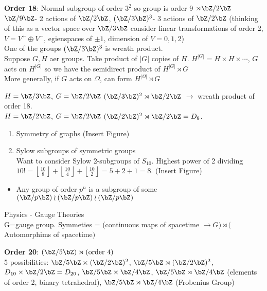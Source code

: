 \noindent
\textbf{Order 18}: Normal subgroup of order $3^2$ so group is order 9 $\rtimes \bZ/2\bZ$ \\
$\bZ/9\bZ$- 2 actions of $\bZ/2\bZ$, $(\bZ/3\bZ)^3$- 3 actions of $\bZ/2\bZ$ (thinking of this as a vector space over $\bZ/3\bZ$ consider linear transformations of order 2, $V = V^+ \oplus V^-$, egienspaces of $\pm 1$, dimension of $V=0,1,2$) \\
One of the groups $(\bZ/3\bZ)^3$ is wreath product. \\
Suppose $G, H$ aer groups. Take product of $|G|$ copies of $H$. $H^{|G|} = H \times H \times \cdots$, $G$ acts on $H^{|G|}$ so we have the semidirect product of $H^{|G|} \rtimes G$ \\
More generally, if $G$ acts on $\Omega$, can form $H^{|\Omega|} \rtimes G$ 

\begin{example}
    $H = \bZ/3\bZ$, $G = \bZ/2\bZ$ $(\bZ/3\bZ)^2 \rtimes \bZ/2\bZ$ $\to$ wreath product of order 18. \\
    $H = \bZ/2\bZ$, $G = \bZ/2\bZ$ $(\bZ/2\bZ)^2 \rtimes \bZ/2\bZ = D_8$. 
\end{example}

\begin{example}
    \begin{enumerate}
        \item Symmetry of graphs (Insert Figure) 
        \item Sylow subgroups of symmetric groups \\
        Want to consider Sylow 2-subgroups of $S_10$. Highest power of 2 dividing $10! = \left\lfloor \frac{10}{8} \right\rfloor + \left\lfloor \frac{10}{4} \right\rfloor + \left\lfloor \frac{10}{2} \right\rfloor = 5 + 2 + 1 =8$. (Insert Figure) 
    \end{enumerate}
\end{example}

\begin{itemize}
    \item Any group of order $p^n$ is a subgroup of some $(\bZ/p\bZ)\wr(\bZ/p\bZ)\wr(\bZ/p\bZ)$ 
\end{itemize}

\noindent
Physics - Gauge Theories \\
G=gauge group. Symmeties = (continuous maps of spacetime $\to G) \rtimes ($Automorphims of spacetime$)$ 

\noindent
\textbf{Order 20}: $(\bZ/5\bZ) \rtimes (\text{order 4})$ \\
5 possibilities: $\bZ/5\bZ \times (\bZ/2\bZ)^2$, $\bZ/5\bZ \rtimes (\bZ/2\bZ)^2$, $D_{10} \times \bZ/2\bZ = D_{20}$, $\bZ/5\bZ \times \bZ/4\bZ$, $\bZ/5\bZ \rtimes \bZ/4\bZ$ (elements of order 2, binary tetrahedral), $\bZ/5\bZ \rtimes \bZ/4\bZ$ (Frobenius Group) \\

